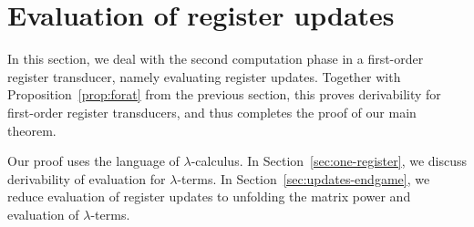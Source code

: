 
\section{Evaluation of register updates}
\label{sec:stt-derivable}
In this section, we deal with the second computation phase in a first-order register transducer, namely evaluating register updates. Together with Proposition~\ref{prop:forat} from the previous section, this proves derivability for  first-order register transducers, and thus completes the proof of our main theorem. 



Our proof uses the language of $\lambda$-calculus.  In Section~\ref{sec:one-register},  we discuss derivability of  evaluation for $\lambda$-terms. In Section~\ref{sec:updates-endgame}, we reduce evaluation of register updates to  unfolding the matrix power  and evaluation of $\lambda$-terms.  


%



  
